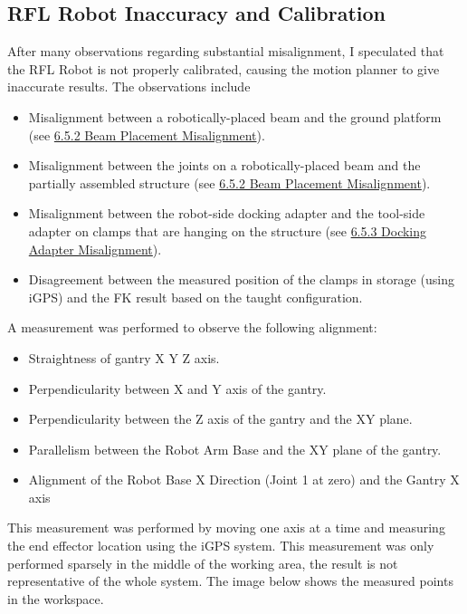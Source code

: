 {\subsection{RFL Robot Inaccuracy and Calibration}
\label{subsection:exploration_3_rfl_robot_inaccuracy_and_calibration}

After many observations regarding substantial misalignment, I speculated that the RFL Robot is not properly calibrated, causing the motion planner to give inaccurate results. The observations include

\begin{itemize}
	\item Misalignment between a robotically-placed beam and the ground platform (see \ul{6.5.2 Beam Placement Misalignment}).

	\item Misalignment between the joints on a robotically-placed beam and the partially assembled structure (see \ul{6.5.2 Beam Placement Misalignment}).

	\item Misalignment between the robot-side docking adapter and the tool-side adapter on clamps that are hanging on the structure (see \ul{6.5.3 Docking Adapter Misalignment}).

	\item Disagreement between the measured position of the clamps in storage (using iGPS) and the FK result based on the taught configuration.

\end{itemize}
A measurement was performed to observe the following alignment:

\begin{itemize}
	\item Straightness of gantry X Y Z axis.

	\item Perpendicularity between X and Y axis of the gantry.

	\item Perpendicularity between the Z axis of the gantry and the XY plane.

	\item Parallelism between the Robot Arm Base and the XY plane of the gantry.

	\item Alignment of the Robot Base X Direction (Joint 1 at zero) and the Gantry X axis

\end{itemize}
This measurement was performed by moving one axis at a time and measuring the end effector location using the iGPS system. This measurement was only performed sparsely in the middle of the working area, the result is not representative of the whole system. The image below shows the measured points in the workspace.

}
